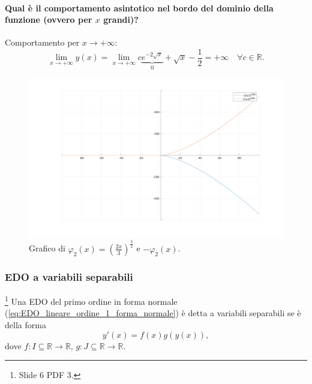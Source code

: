 \begin{example}
    \paragraph{Qual è il comportamento asintotico nel bordo del dominio della funzione (ovvero per $x$ grandi)?} Comportamento per $x\rightarrow+\infty$:
    \begin{equation*}
        \lim_{x\rightarrow+\infty} y(x) = \lim_{x\rightarrow+\infty} c\underbrace{e^{-2\sqrt{x}}}_0 + \sqrt{x} -\frac{1}{2} = +\infty\quad \forall c\in\mathbb R.
    \end{equation*}
\end{example}

\begin{figure}
    \centering
    \includegraphics[width=1.0\textwidth]{Analisi2/figures/Phi.png}
    \caption{Grafico di $\varphi_2(x)=\left(\frac{2x}{3}\right)^{\frac{3}{2}}$ e $-\varphi_2(x)$.}
    \label{fig:phi}
\end{figure}

\subsubsection{EDO a variabili separabili}
\begin{definition}
    \footnote{Slide 6 PDF 3.} Una EDO del primo ordine in forma normale (\ref{eq:EDO_lineare_ordine_1_forma_normale}) è detta a variabili separabili se è della forma
    \begin{equation}\label{eq:EDO_primo_ordine_forma_normale_variabili_separabili}
        y'(x) = f(x) g(y(x)),
    \end{equation}
    dove $f:I\subseteq \mathbb R\rightarrow\mathbb R,\, g: J\subseteq\mathbb R\rightarrow\mathbb R$.
\end{definition}

